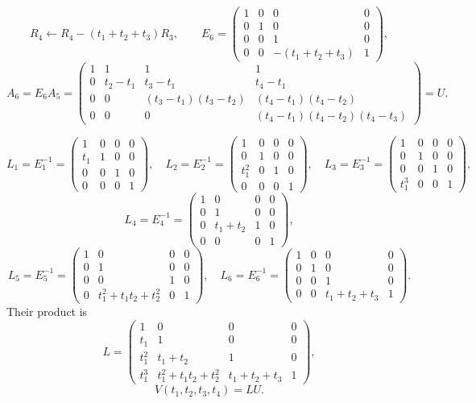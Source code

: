 \documentclass[10pt]{extarticle}
\begin{document}
\[
R_4\leftarrow R_4-(t_1+t_2+t_3)R_3,
\qquad
E_6=
\begin{pmatrix}
1 & 0 & 0 & 0\\
0 & 1 & 0 & 0\\
0 & 0 & 1 & 0\\
0 & 0 & -(t_1+t_2+t_3) & 1
\end{pmatrix},
\]
\[
A_6=E_6A_5=
\begin{pmatrix}
1 & 1 & 1 & 1\\
0 & t_2-t_1 & t_3-t_1 & t_4-t_1\\
0 & 0 & (t_3-t_1)(t_3-t_2) & (t_4-t_1)(t_4-t_2)\\
0 & 0 & 0 & (t_4-t_1)(t_4-t_2)(t_4-t_3)
\end{pmatrix}
=U.
\]

\begingroup
\small
\[
L_1=E_1^{-1}=
\begin{pmatrix}
1 & 0 & 0 & 0\\
t_1 & 1 & 0 & 0\\
0 & 0 & 1 & 0\\
0 & 0 & 0 & 1
\end{pmatrix},
\quad
L_2=E_2^{-1}=
\begin{pmatrix}
1 & 0 & 0 & 0\\
0 & 1 & 0 & 0\\
t_1^2 & 0 & 1 & 0\\
0 & 0 & 0 & 1
\end{pmatrix},
\quad
L_3=E_3^{-1}=
\begin{pmatrix}
1 & 0 & 0 & 0\\
0 & 1 & 0 & 0\\
0 & 0 & 1 & 0\\
t_1^3 & 0 & 0 & 1
\end{pmatrix},
\]
\[
L_4=E_4^{-1}=
\begin{pmatrix}
1 & 0 & 0 & 0\\
0 & 1 & 0 & 0\\
0 & t_1+t_2 & 1 & 0\\
0 & 0 & 0 & 1
\end{pmatrix},
\]
\[
L_5=E_5^{-1}=
\begin{pmatrix}
1 & 0 & 0 & 0\\
0 & 1 & 0 & 0\\
0 & 0 & 1 & 0\\
0 & t_1^2+t_1t_2+t_2^2 & 0 & 1
\end{pmatrix},
\quad
L_6=E_6^{-1}=
\begin{pmatrix}
1 & 0 & 0 & 0\\
0 & 1 & 0 & 0\\
0 & 0 & 1 & 0\\
0 & 0 & t_1+t_2+t_3 & 1
\end{pmatrix}.
\]
\endgroup
Their product is
\begingroup
\[
L=
\begin{pmatrix}
1 & 0 & 0 & 0\\
t_1 & 1 & 0 & 0\\
t_1^2 & t_1+t_2 & 1 & 0\\
t_1^3 & t_1^2+t_1t_2+t_2^2 & t_1+t_2+t_3 & 1
\end{pmatrix},
\]
\[
V(t_1,t_2,t_3,t_4)=LU.
\]
\endgroup
\end{document}
